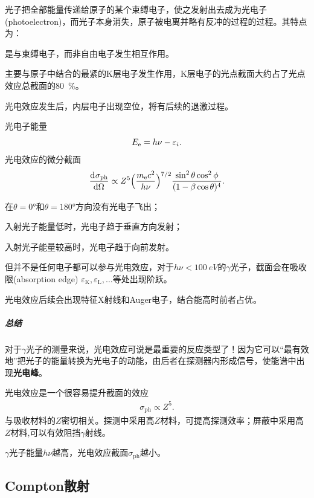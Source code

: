 光子把全部能量传递给原子的某个束缚电子，使之发射出去成为光电子(photoelectron)，而光子本身消失，原子被电离并略有反冲的过程的过程。其特点为：
\begin{compactenum}
	\item 是与束缚电子，而非自由电子发生相互作用。
	\item 主要与原子中结合的最紧的K层电子发生作用，K层电子的光点截面大约占了光点效应总截面的\qty{80}{\percent}。
	\item 光电效应发生后，内层电子出现空位，将有后续的退激过程。
\end{compactenum}
光电子能量 
\begin{equation}\label{eq:nrd-photoelectron-energy}
	E_{\mathrm{e}} = h\nu - \varepsilon_i.
\end{equation}
光电效应的微分截面
\[
	\frac{\mathop{}\!\mathrm{d}^{}\sigma_{\mathrm{ph}}}{\mathrm{d}{\Omega}^{}} \propto Z^5\Bigl(\frac{m_{\mathrm{e}} c^2}{h\nu}\Bigr)^{7/2}\frac{\sin^2\theta\cos^2\phi}{(1 - \beta\cos\theta)^4}.
\]
\begin{compactenum}
	\item 在$\theta = \ang{0}$和$\theta = \ang{180}$方向没有光电子飞出；
	\item 入射光子能量低时，光电子趋于垂直方向发射；
	\item 入射光子能量较高时，光电子趋于向前发射。
\end{compactenum}

但并不是任何电子都可以参与光电效应，对于$h\nu < \qty{100}{eV}$的$\gamma$光子，截面会在吸收限(absorption edge) $\varepsilon_\mathrm K,\varepsilon_\mathrm L,\ldots$等处出现阶跃。

光电效应后续会出现特征X射线和Auger电子，结合能高时前者占优。

\subparagraph{总结}
对于$\gamma$光子的测量来说，光电效应可说是最重要的反应类型了！因为它可以“最有效地”把光子的能量转换为光电子的动能，由后者在探测器内形成信号，使能谱中出现\textbf{光电峰}。

光电效应是一个很容易提升截面的效应
\begin{align}
	\sigma_{\mathrm{ph}} \propto Z^5.
\end{align}
与吸收材料的$Z$密切相关。探测中采用高$Z$材料，可提高探测效率；屏蔽中采用高$Z$材料,可以有效阻挡$\gamma$射线。

$\gamma$光子能量$h\nu$越高，光电效应截面$\sigma_{\mathrm{ph}}$越小。

\subsection{Compton散射}

